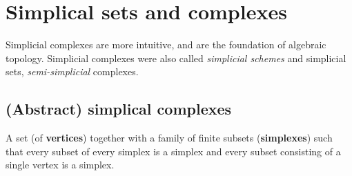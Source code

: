 \documentclass{book}
\begin{document}
\chapter{Simplical sets and complexes}
\cite{weibelIntroductionHomologicalAlgebra1994}
Simplicial complexes are more intuitive, and are the foundation of algebraic topology. Simplicial complexes were also called \textit{simplicial schemes} and simplicial sets, \textit{semi-simplicial} complexes. 

\section{(Abstract) simplical complexes}

A set (of \textbf{vertices}) together with a  family of finite subsets (\textbf{simplexes}) such that every subset of every simplex is a simplex and every subset consisting of a single vertex is a simplex.  
\end{document}
